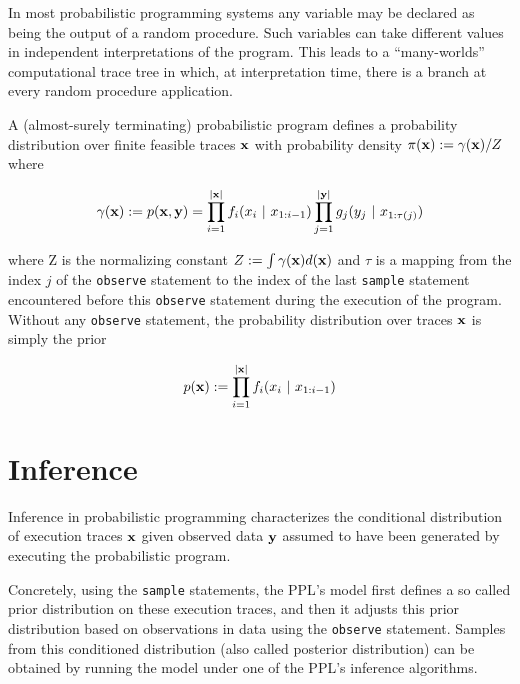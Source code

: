 In most probabilistic programming systems any variable may be declared as being the output of a random procedure. Such variables can take different values in independent interpretations of the program. This leads to a ``many-worlds'' computational trace tree in which, at interpretation time, there is a branch at every random procedure application.


A (almost-surely terminating) probabilistic program defines a probability distribution over finite feasible traces $\boldsymbol{\mathbf{x}}$ with probability density $\pi(\boldsymbol{\mathbf{x}}) := \gamma(\boldsymbol{\mathbf{x}}) / Z$ where 

\begin{equation*}
\gamma(\boldsymbol{\mathbf{x}}) := p(\boldsymbol{\mathbf{x}}, \boldsymbol{\mathbf{y}}) = \prod_{i=1}^{|\boldsymbol{\mathbf{x}}|}{f_{i}(x_i~|~x_{1:i-1})} \prod_{j=1}^{|\boldsymbol{\mathbf{y}}|}{g_j(y_j~|~x_{1:\tau(j)})}
\end{equation*}

where Z is the normalizing constant $Z := \int{\gamma(\ensuremath{\boldsymbol{\mathbf{x}}}) d(\ensuremath{\boldsymbol{\mathbf{x}}})}$ and $\tau$ is a mapping from the index $j$ of the \texttt{observe} statement to the index of the last \texttt{sample} statement encountered before this \texttt{observe} statement during the execution of the program. Without any \texttt{observe} statement, the probability distribution over traces $\boldsymbol{\mathbf{x}}$ is simply the prior

\begin{equation*}
p(\boldsymbol{\mathbf{x}}) := \prod_{i=1}^{|\boldsymbol{\mathbf{x}}|}{f_{i}(x_i~|~x_{1:i-1})}
\end{equation*}

\section{Inference}

Inference in probabilistic programming characterizes the conditional distribution of execution traces $\boldsymbol{\mathbf{x}}$ given observed data $\boldsymbol{\mathbf{y}}$ assumed to have been generated by executing the probabilistic program.

Concretely, using the \texttt{sample} statements, the \gls{PPL}'s model first defines a so called prior distribution on these execution traces, and then it adjusts this prior distribution based on observations in data using the \texttt{observe} statement. Samples from this conditioned distribution (also called posterior distribution) can be obtained by running the model under one of the \gls{PPL}’s inference algorithms.


